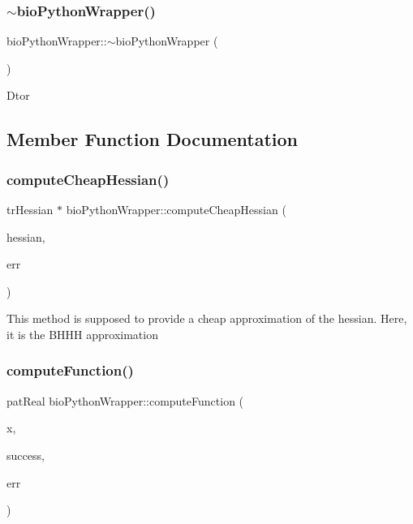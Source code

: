 \subsubsection{\texorpdfstring{$\sim$bio\+Python\+Wrapper()}{~bioPythonWrapper()}}
{\footnotesize\ttfamily bio\+Python\+Wrapper\+::$\sim$bio\+Python\+Wrapper (\begin{DoxyParamCaption}{ }\end{DoxyParamCaption})}

Dtor 

\subsection{Member Function Documentation}
\mbox{\label{classbio_python_wrapper_a406bb4c61e198ec7aa6f55f8d466c8d0}} 
\subsubsection{\texorpdfstring{compute\+Cheap\+Hessian()}{computeCheapHessian()}}
{\footnotesize\ttfamily tr\+Hessian $\ast$ bio\+Python\+Wrapper\+::compute\+Cheap\+Hessian (\begin{DoxyParamCaption}\item[{tr\+Hessian $\ast$}]{hessian,  }\item[{pat\+Error $\ast$\&}]{err }\end{DoxyParamCaption})}

This method is supposed to provide a cheap approximation of the hessian. Here, it is the B\+H\+HH approximation \mbox{\label{classbio_python_wrapper_a69d029db3ab8c8189d2ac832093b8d61}} 
\subsubsection{\texorpdfstring{compute\+Function()}{computeFunction()}}
{\footnotesize\ttfamily pat\+Real bio\+Python\+Wrapper\+::compute\+Function (\begin{DoxyParamCaption}\item[{tr\+Vector $\ast$}]{x,  }\item[{pat\+Boolean $\ast$}]{success,  }\item[{pat\+Error $\ast$\&}]{err }\end{DoxyParamCaption})}

